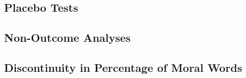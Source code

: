 \documentclass[12pt]{article}
\begin{document}
\clearpage
\subsection{Placebo Tests}




\clearpage
\subsection{Non-Outcome Analyses}




\clearpage
\subsection{Discontinuity in Percentage of Moral Words}\label{app:percent}





\clearpage


\end{document}
